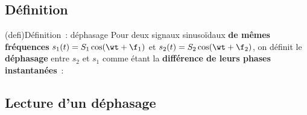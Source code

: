 \documentclass[../../main/main.tex]{subfiles}
\begin{document}
\subsection{Définition}
\begin{tcb}(defi){Définition~: déphasage}
	Pour deux signaux sinusoïdaux \textbf{de mêmes fréquences} $s_1(t) =
		S_1\cos(\wt+\f_1)$ et $s_2(t) = S_2\cos(\wt+\f_2)$, on définit le
	\textbf{déphasage} entre $s_2$ et $s_1$ comme étant la \textbf{différence de
		leurs phases instantanées}~:
	\psw{
		\[
			\D\f_{2/1} = (\wt + \f_2) - (\wt+\f_1)
			\Lra
			\boxed{\D\f_{2/1} = \f_2 - \f_1}
		\]
	}
	\vspace{-15pt}
\end{tcb}

\subsection{Lecture d'un déphasage}
\end{document}
